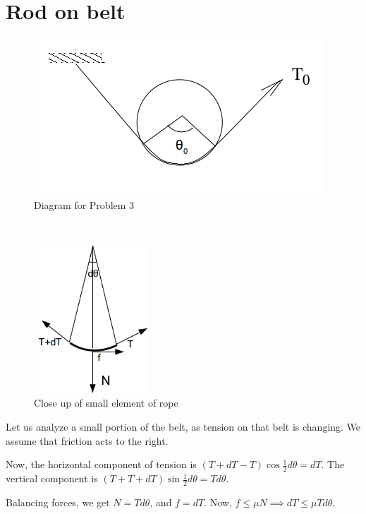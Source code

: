 \documentclass[12pt]{article}
\begin{document}
\section{Rod on belt}
\begin{figure}[h]
\centering
\includegraphics[scale=0.6]{3D}
\caption{Diagram for Problem 3}

\label{fig:3d}
\end{figure}
 ~\\
\begin{figure}
  \begin{center}
    \includegraphics[width=0.38\textwidth]{3D2}
  \end{center}
  
  \caption{\footnotesize Close up of small element of rope}
  \label{fig:3D2}
\end{figure}

Let us analyze a small portion of the belt, as tension on that belt is changing. We assume that friction acts to the right.

Now, the horizontal component of tension is $(T+dT-T)\cos{\frac12 d\theta}=dT$. The vertical component is $(T+T+dT)\sin{\frac12 d\theta}=Td\theta$.

Balancing forces, we get $N=Td\theta$, and $f=dT$. Now, $f\leq \mu N \implies dT\leq \mu Td\theta$.
\end{document}
